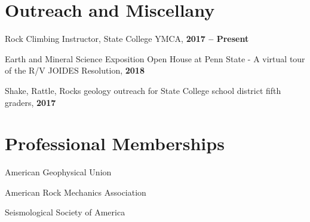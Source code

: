 \documentclass[11pt,letterpaper]{article}
\renewenvironment{itemize}{
  \begin{list}{}{
      \setlength{\leftmargin}{1.5em}
      \setlength{\itemsep}{0.25em}
      \setlength{\parskip}{0pt}
      \setlength{\parsep}{0.25em}
    }
}{
  \end{list}
}
\begin{document}


\section*{Outreach and Miscellany}
\begin{itemize}
    \item Rock Climbing Instructor, State College YMCA, {\bf 2017 -- Present}
    \item Earth and Mineral Science Exposition Open House at Penn State - A virtual tour of the R/V JOIDES Resolution, {\bf  2018}
    \item Shake, Rattle, Rocks geology outreach for State College school district fifth graders, {\bf 2017}
\end{itemize}




\section*{Professional Memberships}
\begin{itemize}
    \item American Geophysical Union
    \item American Rock Mechanics Association
    \item Seismological Society of America
\end{itemize}
\end{document}

